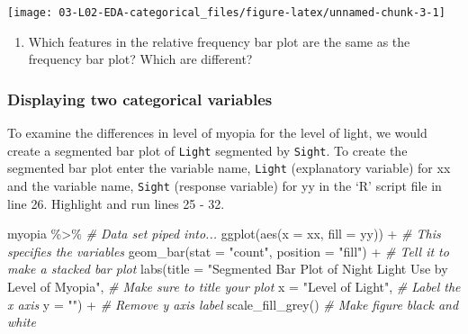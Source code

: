 \documentclass[
]{report}
\newenvironment{Shaded}{\begin{snugshade}}{\end{snugshade}}
\newcommand{\AttributeTok}[1]{\textcolor[rgb]{0.77,0.63,0.00}{#1}}
\newcommand{\CommentTok}[1]{\textcolor[rgb]{0.56,0.35,0.01}{\textit{#1}}}
\newcommand{\FunctionTok}[1]{\textcolor[rgb]{0.00,0.00,0.00}{#1}}
\newcommand{\NormalTok}[1]{#1}
\newcommand{\SpecialCharTok}[1]{\textcolor[rgb]{0.00,0.00,0.00}{#1}}
\newcommand{\StringTok}[1]{\textcolor[rgb]{0.31,0.60,0.02}{#1}}
\providecommand{\tightlist}{%
  \setlength{\itemsep}{0pt}\setlength{\parskip}{0pt}}
\begin{document}
\begin{center}\texttt{[image: 03-L02-EDA-categorical\_files/figure-latex/unnamed-chunk-3-1]} \end{center}

\begin{enumerate}
\def\labelenumi{\arabic{enumi}.}
\setcounter{enumi}{3}
\tightlist
\item
  Which features in the relative frequency bar plot are the same as the frequency bar plot? Which are different?
\end{enumerate}

\vspace{1in}

\newpage

\hypertarget{displaying-two-categorical-variables}{%
\subsubsection*{Displaying two categorical variables}\label{displaying-two-categorical-variables}}

To examine the differences in level of myopia for the level of light, we would create a segmented bar plot of \texttt{Light} segmented by \texttt{Sight}. To create the segmented bar plot enter the variable name, \texttt{Light} (explanatory variable) for xx and the variable name, \texttt{Sight} (response variable) for yy in the `R' script file in line 26. Highlight and run lines 25 - 32.

\begin{Shaded}
\begin{Highlighting}[]
\NormalTok{myopia }\SpecialCharTok{\%\textgreater{}\%} \CommentTok{\# Data set piped into...}
\FunctionTok{ggplot}\NormalTok{(}\FunctionTok{aes}\NormalTok{(}\AttributeTok{x =}\NormalTok{ xx, }\AttributeTok{fill =}\NormalTok{ yy)) }\SpecialCharTok{+}   \CommentTok{\# This specifies the variables}
  \FunctionTok{geom\_bar}\NormalTok{(}\AttributeTok{stat =} \StringTok{"count"}\NormalTok{, }\AttributeTok{position =} \StringTok{"fill"}\NormalTok{) }\SpecialCharTok{+}  \CommentTok{\# Tell it to make a stacked bar plot}
  \FunctionTok{labs}\NormalTok{(}\AttributeTok{title =} \StringTok{"Segmented Bar Plot of Night Light Use by Level of Myopia"}\NormalTok{,  }
       \CommentTok{\# Make sure to title your plot }
       \AttributeTok{x =} \StringTok{"Level of Light"}\NormalTok{,   }\CommentTok{\# Label the x axis}
       \AttributeTok{y =} \StringTok{""}\NormalTok{) }\SpecialCharTok{+}  \CommentTok{\# Remove y axis label}
    \FunctionTok{scale\_fill\_grey}\NormalTok{()  }\CommentTok{\# Make figure black and white}
\end{Highlighting}
\end{Shaded}
\end{document}

